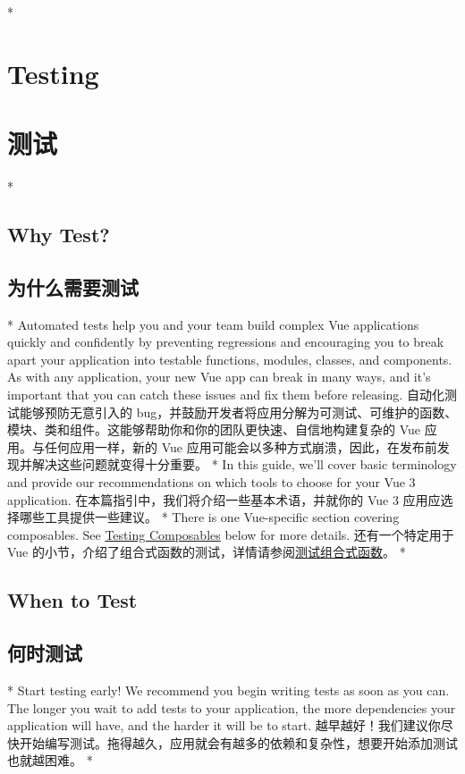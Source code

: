 
\begin{paracol}{2}
 
\switchcolumn[0]*%
\section{Testing}
\switchcolumn
\section{测试}
\switchcolumn[0]*%
\subsection{Why Test?}
\switchcolumn
\subsection{为什么需要测试}
\switchcolumn[0]*%
Automated tests help you and your team build complex Vue applications
quickly and confidently by preventing regressions and encouraging you to
break apart your application into testable functions, modules, classes,
and components. As with any application, your new Vue app can break in
many ways, and it's important that you can catch these issues and fix
them before releasing.
\switchcolumn
自动化测试能够预防无意引入的
bug，并鼓励开发者将应用分解为可测试、可维护的函数、模块、类和组件。这能够帮助你和你的团队更快速、自信地构建复杂的
Vue 应用。与任何应用一样，新的 Vue
应用可能会以多种方式崩溃，因此，在发布前发现并解决这些问题就变得十分重要。
\switchcolumn[0]*%
In this guide, we'll cover basic terminology and provide our
recommendations on which tools to choose for your Vue 3 application.
\switchcolumn
在本篇指引中，我们将介绍一些基本术语，并就你的 Vue 3
应用应选择哪些工具提供一些建议。
\switchcolumn[0]*%
There is one Vue-specific section covering composables. See
\href{https://vuejs.org/guide/scaling-up/testing.html\#testing-composables}{Testing
Composables} below for more details.
\switchcolumn
还有一个特定用于 Vue
的小节，介绍了组合式函数的测试，详情请参阅\href{https://cn.vuejs.org/guide/scaling-up/testing.html\#testing-composables}{测试组合式函数}。
\switchcolumn[0]*%
\subsection{When to Test}
\switchcolumn
\subsection{何时测试}
\switchcolumn[0]*%
Start testing early! We recommend you begin writing tests as soon as you
can. The longer you wait to add tests to your application, the more
dependencies your application will have, and the harder it will be to
start.
\switchcolumn
越早越好！我们建议你尽快开始编写测试。拖得越久，应用就会有越多的依赖和复杂性，想要开始添加测试也就越困难。
\switchcolumn[0]*%

\end{paracol}
